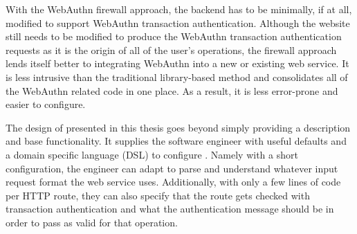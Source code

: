 With the WebAuthn firewall approach, the backend has to be minimally, if at all, modified to support WebAuthn transaction authentication. Although the website still needs to be modified to produce the WebAuthn transaction authentication requests as it is the origin of all of the user's operations, the firewall approach lends itself better to integrating WebAuthn into a new or existing web service. It is less intrusive than the traditional library-based method and consolidates all of the WebAuthn related code in one place. As a result, it is less error-prone and easier to configure. 




The design of \sys{} presented in this thesis goes beyond simply providing a description and base functionality. It supplies the software engineer with useful defaults and a domain specific language (DSL) to configure \sys{}. Namely with a short configuration, the engineer can adapt \sys{} to parse and understand whatever input request format the web service uses. Additionally, with only a few lines of code per HTTP route, they can also specify that the route gets checked with transaction authentication and what the authentication message should be in order to pass as valid for that operation. 




